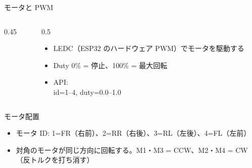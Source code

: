 \begin{frame}{モータと PWM}
  \begin{columns}[T]
    \begin{column}{0.45\textwidth}
      \centering
      \resizebox{!}{0.62\textheight}{}
    \end{column}
    \begin{column}{0.5\textwidth}
      \vspace{1em}
      \begin{itemize}\small
        \item LEDC（ESP32 のハードウェア PWM）でモータを駆動する
        \item Duty 0\% = 停止、100\% = 最大回転
        \item API: \\
              \small id=1--4, duty=0.0--1.0
      \end{itemize}
    \end{column}
  \end{columns}
\end{frame}

\begin{frame}{モータ配置}
  \begin{center}
    \resizebox{0.4\textwidth}{!}{}
  \end{center}
  \begin{itemize}\small
    \item モータ ID: 1=FR（右前）、2=RR（右後）、3=RL（左後）、4=FL（左前）
    \item 対角のモータが同じ方向に回転する。M1・M3 = CCW、M2・M4 = CW（反トルクを打ち消す）
  \end{itemize}
\end{frame}

